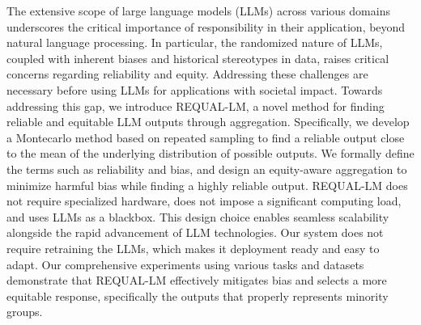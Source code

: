 The extensive scope of large language models (LLMs) across various domains underscores the critical importance of responsibility in their application, beyond natural language processing. In particular, the randomized nature of LLMs, coupled with inherent biases and historical stereotypes in data, raises critical concerns regarding reliability and equity. Addressing these challenges are necessary before using LLMs for applications with societal impact. Towards addressing this gap, we introduce REQUAL-LM, a novel method for finding reliable and equitable LLM outputs through aggregation. Specifically, we develop a Montecarlo method based on repeated sampling to find a reliable output close to the mean of the underlying distribution of possible outputs. We formally define the terms such as reliability and bias, and design an equity-aware aggregation to minimize harmful bias while finding a highly reliable output. REQUAL-LM does not require specialized hardware, does not impose a significant computing load, and uses LLMs as a blackbox. This design choice enables seamless scalability alongside the rapid advancement of LLM technologies. Our system does not require retraining the LLMs, which makes it deployment ready and easy to adapt. Our comprehensive experiments using various tasks and datasets demonstrate that REQUAL-LM effectively mitigates bias and selects a more equitable response, specifically the outputs that properly represents minority groups.